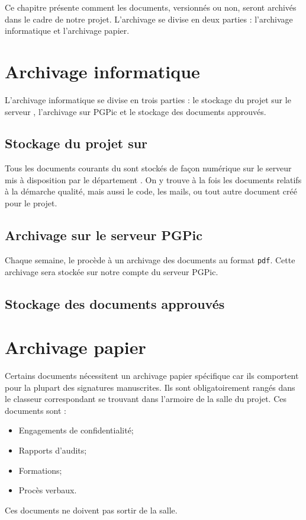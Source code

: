 
Ce chapitre présente comment les documents, versionnés ou non, seront archivés dans le cadre de notre projet. L’archivage se divise en deux parties : l’archivage informatique et l’archivage papier.

\section{Archivage informatique}
L'archivage informatique se divise en trois parties : le stockage du projet sur le serveur \git{}, l'archivage sur PGPic et le stockage des documents approuvés.

\subsection{Stockage du projet sur \git{}}
Tous les documents courants du \PICCourt sont stockés de façon numérique sur le serveur \git{} mis à disposition par le département \ASI{}. On y trouve à la fois les documents relatifs à la démarche qualité, mais aussi le code, les mails, ou tout autre document créé pour le projet.

\subsection{Archivage sur le serveur PGPic}

Chaque semaine, le \RQ{} procède à un archivage des documents au format \verb+pdf+. Cette archivage sera stockée sur notre compte du serveur PGPic.

\subsection{Stockage des documents approuvés}



\section{Archivage papier}
Certains documents nécessitent un archivage papier spécifique car ils comportent pour la plupart des signatures manuscrites. Ils sont obligatoirement rangés dans le classeur correspondant se trouvant dans l’armoire de la salle du projet. Ces documents sont :
\begin{itemize}
\item Engagements de confidentialité;
\item Rapports d’audits;
\item Formations;
\item Procès verbaux.
\end{itemize}
Ces documents ne doivent pas sortir de la salle.